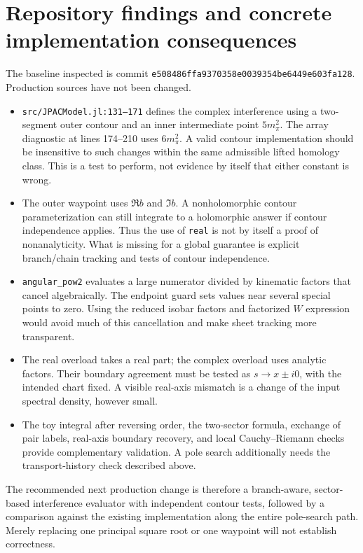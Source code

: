 \documentclass[11pt,a4paper]{article}
\begin{document}
\section{Repository findings and concrete implementation consequences}
The baseline inspected is commit \texttt{e508486ffa9370358e0039354be6449e603fa128}. Production sources have not been changed.
\begin{itemize}
\item \texttt{src/JPACModel.jl:131--171} defines the complex interference using a two-segment outer contour and an inner intermediate point $5m_\pi^2$. The array diagnostic at lines 174--210 uses $6m_\pi^2$. A valid contour implementation should be insensitive to such changes within the same admissible lifted homology class. This is a test to perform, not evidence by itself that either constant is wrong.
\item The outer waypoint uses $\Re b$ and $\Im b$. A nonholomorphic contour parameterization can still integrate to a holomorphic answer if contour independence applies. Thus the use of \texttt{real} is not by itself a proof of nonanalyticity. What is missing for a global guarantee is explicit branch/chain tracking and tests of contour independence.
\item \texttt{angular\_pow2} evaluates a large numerator divided by kinematic factors that cancel algebraically. The endpoint guard sets values near several special points to zero. Using the reduced isobar factors and factorized $W$ expression would avoid much of this cancellation and make sheet tracking more transparent.
\item The real overload takes a real part; the complex overload uses analytic factors. Their boundary agreement must be tested as $s\to x\pm i0$, with the intended chart fixed. A visible real-axis mismatch is a change of the input spectral density, however small.
\item The toy integral after reversing order, the two-sector formula, exchange of pair labels, real-axis boundary recovery, and local Cauchy--Riemann checks provide complementary validation. A pole search additionally needs the transport-history check described above.
\end{itemize}
The recommended next production change is therefore a branch-aware, sector-based interference evaluator with independent contour tests, followed by a comparison against the existing implementation along the entire pole-search path. Merely replacing one principal square root or one waypoint will not establish correctness.
\end{document}
